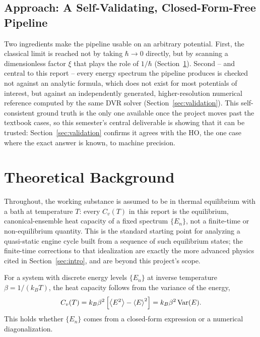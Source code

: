 \documentclass[10pt,conference]{IEEEtran}
\begin{document}
\subsection{Approach: A Self-Validating, Closed-Form-Free Pipeline}
Two ingredients make the pipeline usable on an arbitrary potential. First, the classical limit is reached not by taking $\hbar\to0$ directly, but by scanning a dimensionless factor $\xi$ that plays the role of $1/\hbar$ (Section~\ref{sec:theory}). Second -- and central to this report -- every energy spectrum the pipeline produces is checked not against an analytic formula, which does not exist for most potentials of interest, but against an independently generated, higher-resolution numerical reference computed by the same DVR solver (Section~\ref{sec:validation}). This self-consistent ground truth is the only one available once the project moves past the textbook cases, so this semester's central deliverable is showing that it can be trusted: Section~\ref{sec:validation} confirms it agrees with the HO, the one case where the exact answer is known, to machine precision.

\section{Theoretical Background}
\label{sec:theory}
Throughout, the working substance is assumed to be in thermal equilibrium with a bath at temperature $T$: every $C_v(T)$ in this report is the equilibrium, canonical-ensemble heat capacity of a fixed spectrum $\{E_n\}$, not a finite-time or non-equilibrium quantity. This is the standard starting point for analyzing a quasi-static engine cycle built from a sequence of such equilibrium states; the finite-time corrections to that idealization are exactly the more advanced physics cited in Section~\ref{sec:intro}, and are beyond this project's scope.

For a system with discrete energy levels $\{E_n\}$ at inverse temperature $\beta=1/(k_BT)$, the heat capacity follows from the variance of the energy,
\begin{equation}
C_v(T) = k_B \beta^2 \left[\expval{E^2} - \expval{E}^2\right] = k_B\beta^2\,\mathrm{Var}(E).
\label{eq:cv_general}
\end{equation}
This holds whether $\{E_n\}$ comes from a closed-form expression or a numerical diagonalization.
\end{document}
